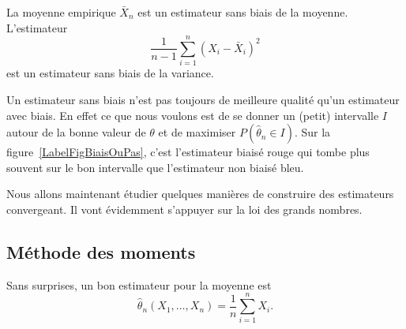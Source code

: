 \begin{example}
	La moyenne empirique \( \bar X_n\) est un estimateur sans biais de la moyenne. L'estimateur
	\begin{equation}
		\frac{1}{ n-1 }\sum_{i=1}^n(X_i-\bar X_i)^2
	\end{equation}
	est un estimateur sans biais de la variance.
\end{example}

Un estimateur sans biais n'est pas toujours de meilleure qualité qu'un estimateur avec biais. En effet ce que nous voulons est de se donner un (petit) intervalle  \( I\) autour de la bonne valeur de \( \theta\) et de maximiser \( P(\hat\theta_n\in I)\). Sur la figure~\ref{LabelFigBiaisOuPas}, c'est l'estimateur biaisé rouge qui tombe plus souvent sur le bon intervalle que l'estimateur non biaisé bleu.
\newcommand{\CaptionFigBiaisOuPas}{Un estimateur sans biais et un avec biais.}


Nous allons maintenant étudier quelques manières de construire des estimateurs convergeant. Il vont évidemment s'appuyer sur la loi des grands nombres.

\subsection{Méthode des moments}

Sans surprises, un bon estimateur pour la moyenne est
\begin{equation}
	\hat\theta_n(X_1,\ldots,X_n)=\frac{1}{ n }\sum_{i=1}^nX_i.
\end{equation}

